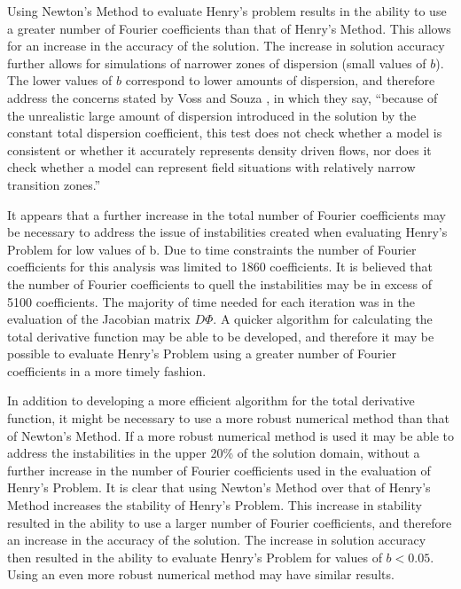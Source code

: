 Using Newton's Method to evaluate Henry's problem results in the ability to use a greater number of
Fourier coefficients than that of Henry's Method. This allows for an increase in the accuracy of the
solution. The increase in solution accuracy further allows for simulations of narrower zones of
dispersion (small values of $b$). The lower values of $b$ correspond to lower amounts of dispersion,
and therefore address the concerns stated by Voss and Souza \cite{Voss}, in which they say,
``because of the unrealistic large amount of dispersion introduced in the solution by the constant
total dispersion coefficient, this test does not check whether a model is consistent or whether it
accurately represents density driven flows, nor does it check whether a model can represent field
situations with relatively narrow transition zones.'' 

It appears that a further increase in the total number of Fourier coefficients may be necessary to
address the issue of instabilities created when evaluating Henry's Problem for low values of b. Due
to time constraints the number of Fourier coefficients for this analysis was limited to 1860
coefficients. It is believed that the number of Fourier coefficients to quell the instabilities may
be in excess of 5100 coefficients. The majority of time needed for each iteration was in the
evaluation of the Jacobian matrix $D\Phi $. A quicker algorithm for calculating the total derivative
function may be able to be developed, and therefore it may be possible to evaluate Henry's Problem
using a greater number of Fourier coefficients in a more timely fashion.

In addition to developing a more efficient algorithm for the total derivative function, it might be
necessary to use a more robust numerical method than that of Newton's Method. If a more robust
numerical method is used it may be able to address the instabilities in the upper 20\% of the
solution domain, without a further increase in the number of Fourier coefficients used in the
evaluation of Henry's Problem. It is clear that using Newton's Method over that of Henry's Method
increases the stability of Henry's Problem. This increase in stability resulted in the ability to
use a larger number of Fourier coefficients, and therefore an increase in the accuracy of the
solution. The increase in solution accuracy then resulted in the ability to evaluate Henry's Problem
for values of $b<0.05$. Using an even more robust numerical method may have similar results.
